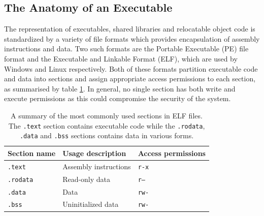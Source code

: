 %



\subsection{The Anatomy of an Executable}
\label{sec:executable_anatomy}

The representation of executables, shared libraries and relocatable object code is standardized by a variety of file formats which provides encapsulation of assembly instructions and data. Two such formats are the Portable Executable (PE) file format and the Executable and Linkable Format (ELF), which are used by Windows and Linux respectively. Both of these formats partition executable code and data into sections and assign appropriate access permissions to each section, as summarised by table \ref{tbl:elf_sections}. In general, no single section has both write and execute permissions as this could compromise the security of the system.

\begin{table}[htbp]
	\begin{center}
		\begin{tabular}{|l|l|l|}
			\hline
			Section name & Usage description & Access permissions \\
			\hline
			\texttt{.text} & Assembly instructions & \texttt{r-x} \\
			\texttt{.rodata} & Read-only data & \texttt{r--} \\
			\texttt{.data} & Data & \texttt{rw-} \\
			\texttt{.bss} & Uninitialized data & \texttt{rw-} \\
			\hline
		\end{tabular}
	\end{center}
	\caption{A summary of the most commonly used sections in ELF files. The \texttt{.text} section contains executable code while the \texttt{.rodata}, \texttt{.data} and \texttt{.bss} sections contains data in various forms.}
	\label{tbl:elf_sections}
\end{table}


